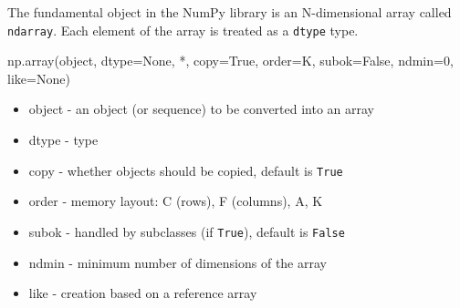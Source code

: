 \documentclass[
  english,
  letterpaper,
  DIV=11,
  numbers=noendperiod]{scrreprt}
\newenvironment{Shaded}{\begin{snugshade}}{\end{snugshade}}
\newcommand{\BuiltInTok}[1]{\textcolor[rgb]{0.00,0.23,0.31}{#1}}
\newcommand{\DecValTok}[1]{\textcolor[rgb]{0.68,0.00,0.00}{#1}}
\newcommand{\NormalTok}[1]{\textcolor[rgb]{0.00,0.23,0.31}{#1}}
\newcommand{\OperatorTok}[1]{\textcolor[rgb]{0.37,0.37,0.37}{#1}}
\newcommand{\StringTok}[1]{\textcolor[rgb]{0.13,0.47,0.30}{#1}}
\newcommand{\VariableTok}[1]{\textcolor[rgb]{0.07,0.07,0.07}{#1}}
\providecommand{\tightlist}{%
  \setlength{\itemsep}{0pt}\setlength{\parskip}{0pt}}
\begin{document}
The fundamental object in the NumPy library is an N-dimensional array
called \texttt{ndarray}. Each element of the array is treated as a
\texttt{dtype} type.

\begin{Shaded}
\begin{Highlighting}[]
\NormalTok{np.array(}\BuiltInTok{object}\NormalTok{, dtype}\OperatorTok{=}\VariableTok{None}\NormalTok{, }\OperatorTok{*}\NormalTok{, copy}\OperatorTok{=}\VariableTok{True}\NormalTok{, order}\OperatorTok{=}\StringTok{\textquotesingle{}K\textquotesingle{}}\NormalTok{, subok}\OperatorTok{=}\VariableTok{False}\NormalTok{, ndmin}\OperatorTok{=}\DecValTok{0}\NormalTok{, like}\OperatorTok{=}\VariableTok{None}\NormalTok{)}
\end{Highlighting}
\end{Shaded}

\begin{itemize}
\tightlist
\item
  object - an object (or sequence) to be converted into an array
\item
  dtype - type
\item
  copy - whether objects should be copied, default is \texttt{True}
\item
  order - memory layout: C (rows), F (columns), A, K
\item
  subok - handled by subclasses (if \texttt{True}), default is
  \texttt{False}
\item
  ndmin - minimum number of dimensions of the array
\item
  like - creation based on a reference array
\end{itemize}
\end{document}
